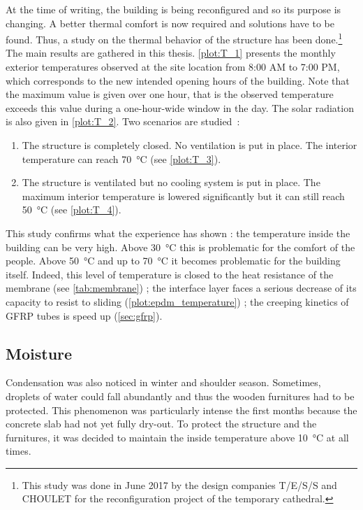 At the time of writing, the building is being reconfigured and so its purpose is changing. A better thermal comfort is now required and solutions have to be found. Thus, a study on the thermal behavior of the structure has been done.\footnote{This study was done in June 2017 by the design companies T/E/S/S and CHOULET for the reconfiguration project of the temporary cathedral.} The main results are gathered in this thesis. \cref{plot:T_1} presents the monthly exterior temperatures observed at the site location from 8:00 AM to 7:00 PM, which corresponds to the new intended opening hours of the building. Note that the maximum value is given over one hour, that is the observed temperature exceeds this value during a one-hour-wide window in the day. The solar radiation is also given in \cref{plot:T_2}. Two scenarios are studied~:
\begin{enumerate}
\item The structure is completely closed. No ventilation is put in place. The interior temperature can reach \SI{70}{\celsius} (see \cref{plot:T_3}).
\item The structure is ventilated but no cooling system is put in place. The maximum interior temperature is lowered significantly but it can still reach \SI{50}{\celsius} (see \cref{plot:T_4}).
\end{enumerate}

This study confirms what the experience has shown : the temperature inside the building can be very high. Above \SI{30}{\celsius} this is problematic for the comfort of the people. Above \SI{50}{\celsius} and up to \SI{70}{\celsius} it becomes problematic for the building itself. Indeed, this level of temperature is closed to the heat resistance of the membrane (see \cref{tab:membrane}) ; the interface layer faces a serious decrease of its capacity to resist to sliding (\cref{plot:epdm_temperature}) ; the creeping kinetics of GFRP tubes is speed up (\cref{sec:gfrp}).

\subsection{Moisture}
Condensation was also noticed in winter and shoulder season. Sometimes, droplets of water could fall abundantly and thus the wooden furnitures had to be protected. This phenomenon was particularly intense the first months because the concrete slab had not yet fully dry-out. To protect the structure and the furnitures, it was decided to maintain the inside temperature above \SI{10}{\celsius} at all times.

